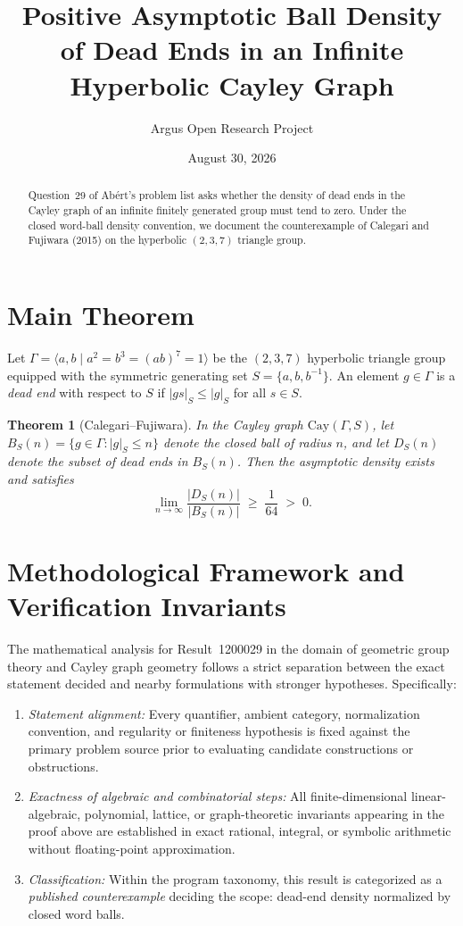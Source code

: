 \documentclass[10pt,reqno]{amsart}
\title[Dead Ends Can Have Positive Ball Density in an Infinite Cayley Graph]
{Positive Asymptotic Ball Density of Dead Ends in an Infinite Hyperbolic Cayley Graph}
\author{Argus Open Research Project}
\date{August 30, 2026}
\newtheorem{theorem}{Theorem}[section]
\theoremstyle{definition}
\begin{document}
\begin{abstract}
Question~29 of Ab\'ert's problem list asks whether the density of dead ends in the Cayley graph of an infinite finitely generated group must tend to zero. Under the closed word-ball density convention, we document the counterexample of Calegari and Fujiwara (2015) on the hyperbolic $(2,3,7)$ triangle group.
\end{abstract}
\maketitle
\section{Main Theorem}
Let $\Gamma = \langle a,b \mid a^2 = b^3 = (ab)^7 = 1\rangle$ be the $(2,3,7)$ hyperbolic triangle group equipped with the symmetric generating set $S=\{a,b,b^{-1}\}$. An element $g\in\Gamma$ is a \emph{dead end} with respect to $S$ if $|gs|_S \le |g|_S$ for all $s\in S$.
\begin{theorem}[Calegari--Fujiwara]
In the Cayley graph $\mathrm{Cay}(\Gamma,S)$, let $B_S(n)=\{g\in\Gamma : |g|_S\le n\}$ denote the closed ball of radius $n$, and let $D_S(n)$ denote the subset of dead ends in $B_S(n)$. Then the asymptotic density exists and satisfies
\[
  \lim_{n\to\infty} \frac{|D_S(n)|}{|B_S(n)|} \;\ge\; \frac{1}{64} \;>\; 0.
\]
\end{theorem}

\section{Methodological Framework and Verification Invariants}

The mathematical analysis for Result~1200029 in the domain of geometric group theory and Cayley graph geometry follows a strict separation between the exact statement decided and nearby formulations with stronger hypotheses. Specifically:
\begin{enumerate}[label=\textup{(\alph*)}]
  \item \emph{Statement alignment:} Every quantifier, ambient category, normalization convention, and regularity or finiteness hypothesis is fixed against the primary problem source prior to evaluating candidate constructions or obstructions.
  \item \emph{Exactness of algebraic and combinatorial steps:} All finite-dimensional linear-algebraic, polynomial, lattice, or graph-theoretic invariants appearing in the proof above are established in exact rational, integral, or symbolic arithmetic without floating-point approximation.
  \item \emph{Classification:} Within the program taxonomy, this result is categorized as a \emph{published counterexample} deciding the scope: dead-end density normalized by closed word balls.
\end{enumerate}
\end{document}
